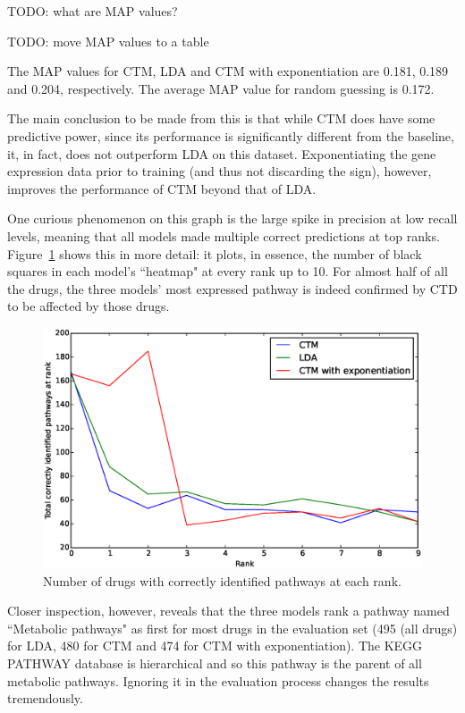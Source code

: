 \documentclass[12pt,a4paper,twoside,openright]{report}
\begin{document}
TODO: what are MAP values?

TODO: move MAP values to a table

The MAP values for CTM, LDA and CTM with exponentiation are 0.181, 0.189 and 0.204, respectively. The average MAP value for random guessing is 0.172.

The main conclusion to be made from this is that while CTM does have some predictive power, since its performance is significantly different from the baseline, it, in fact, does not outperform LDA on this dataset. Exponentiating the gene expression data prior to training (and thus not discarding the sign), however, improves the performance of CTM beyond that of LDA.

One curious phenomenon on this graph is the large spike in precision at low recall levels, meaning that all models made multiple correct predictions at top ranks. Figure~\ref{fig:ctd-side-plot-10} shows this in more detail: it plots, in essence, the number of black squares in each model's ``heatmap" at every rank up to 10. For almost half of all the drugs, the three models' most expressed pathway is indeed confirmed by CTD to be affected by those drugs.

\begin{figure}[!htb]
\includegraphics[width=\textwidth]{ctd-side-plot-10.eps}
\caption{Number of drugs with correctly identified pathways at each rank.}
\label{fig:ctd-side-plot-10}
\end{figure}

Closer inspection, however, reveals that the three models rank a pathway named ``Metabolic pathways" as first for most drugs in the evaluation set (495 (all drugs) for LDA, 480 for CTM and 474 for CTM with exponentiation). The KEGG PATHWAY database is hierarchical and so this pathway is the parent of all metabolic pathways. Ignoring it in the evaluation process changes the results tremendously.
\end{document}
